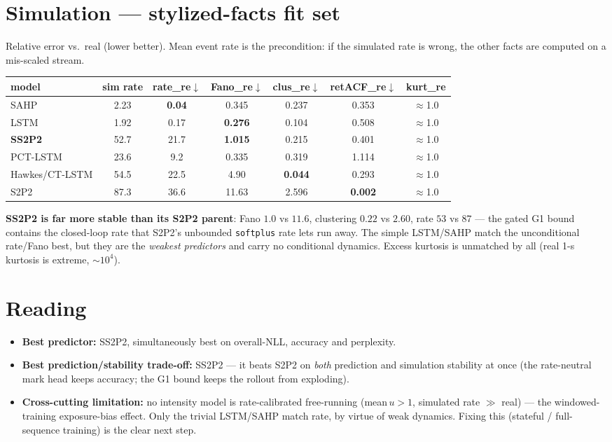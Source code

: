 \documentclass[11pt]{article}
\newcommand{\bbest}[1]{\textbf{#1}}
\begin{document}
\section{Simulation — stylized-facts fit set}
Relative error vs.\ real (lower better). Mean event rate is the precondition: if the simulated rate
is wrong, the other facts are computed on a mis-scaled stream.
\begin{center}\small\renewcommand{\arraystretch}{1.25}
\begin{tabular}{lcccccc}
\toprule
model & sim rate & rate\_re$\downarrow$ & Fano\_re$\downarrow$ & clus\_re$\downarrow$ & retACF\_re$\downarrow$ & kurt\_re\\
\midrule
SAHP     & 2.23 & \bbest{0.04} & 0.345 & 0.237 & 0.353 & $\approx$1.0\\
LSTM     & 1.92 & 0.17 & \bbest{0.276} & 0.104 & 0.508 & $\approx$1.0\\
\rowcolor{best}\textbf{SS2P2} & 52.7 & 21.7 & \bbest{1.015} & 0.215 & 0.401 & $\approx$1.0\\
PCT-LSTM & 23.6 & 9.2 & 0.335 & 0.319 & 1.114 & $\approx$1.0\\
Hawkes/CT-LSTM & 54.5 & 22.5 & 4.90 & \bbest{0.044} & 0.293 & $\approx$1.0\\
S2P2     & 87.3 & 36.6 & 11.63 & 2.596 & \bbest{0.002} & $\approx$1.0\\
\bottomrule
\end{tabular}
\end{center}
\noindent\textbf{SS2P2 is far more stable than its S2P2 parent}: Fano $1.0$ vs $11.6$, clustering
$0.22$ vs $2.60$, rate $53$ vs $87$ — the gated G1 bound contains the closed-loop rate that S2P2's
unbounded \texttt{softplus} rate lets run away. The simple LSTM/SAHP match the unconditional rate/Fano
best, but they are the \emph{weakest predictors} and carry no conditional dynamics. Excess kurtosis is
unmatched by all (real 1-s kurtosis is extreme, $\sim\!10^4$).

\section{Reading}
\begin{itemize}[leftmargin=1.4em,itemsep=2pt]
\item \textbf{Best predictor:} SS2P2, simultaneously best on overall-NLL, accuracy and perplexity.
\item \textbf{Best prediction/stability trade-off:} SS2P2 — it beats S2P2 on \emph{both} prediction and
simulation stability at once (the rate-neutral mark head keeps accuracy; the G1 bound keeps the rollout
from exploding).
\item \textbf{Cross-cutting limitation:} no intensity model is rate-calibrated free-running
(mean\,$u>1$, simulated rate $\gg$ real) — the windowed-training exposure-bias effect. Only the trivial
LSTM/SAHP match rate, by virtue of weak dynamics. Fixing this (stateful / full-sequence training) is the
clear next step.
\end{itemize}
\end{document}
